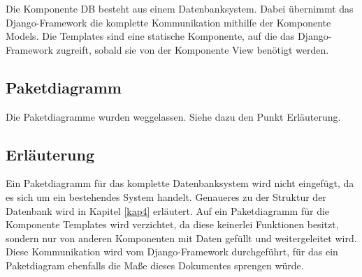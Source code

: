 Die Komponente DB besteht aus einem Datenbanksystem. 
Dabei übernimmt das Django-Framework die komplette Kommunikation mithilfe 
der Komponente Models. 
Die Templates sind eine statische Komponente, auf die das Django-Framework
zugreift, sobald sie von der Komponente View benötigt werden. 

\subsection{Paketdiagramm}
Die Paketdiagramme wurden weggelassen. Siehe dazu den Punkt Erläuterung.

\subsection{Erl\"auterung}
Ein Paketdiagramm für das komplette Datenbanksystem wird nicht eingefügt, da es
sich um ein bestehendes System handelt. Genaueres zu der Struktur der
Datenbank wird in Kapitel \ref{kap4} erläutert.
Auf ein Paketdiagramm für die Komponente Templates wird verzichtet, da diese
keinerlei Funktionen besitzt, sondern nur von anderen Komponenten mit Daten
gefüllt und weitergeleitet wird. Diese Kommunikation wird vom Django-Framework
durchgeführt, für das ein Paketdiagram ebenfalls die Maße dieses Dokumentes
sprengen würde.
